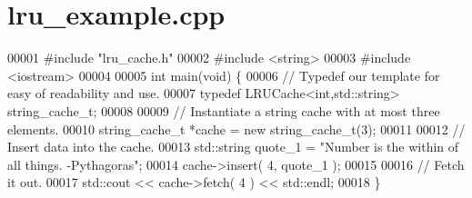\section{lru\_\-example.cpp}

\begin{DoxyCode}
00001 \textcolor{preprocessor}{#include "lru_cache.h"}
00002 \textcolor{preprocessor}{#include <string>}
00003 \textcolor{preprocessor}{#include <iostream>}
00004 
00005 \textcolor{keywordtype}{int} main(\textcolor{keywordtype}{void}) \{
00006         \textcolor{comment}{// Typedef our template for easy of readability and use.}
00007         \textcolor{keyword}{typedef} LRUCache<int,std::string> string\_cache\_t;
00008         
00009         \textcolor{comment}{// Instantiate a string cache with at most three elements.}
00010         string\_cache\_t *cache = \textcolor{keyword}{new} string\_cache\_t(3);
00011         
00012         \textcolor{comment}{// Insert data into the cache.}
00013         std::string quote\_1 = \textcolor{stringliteral}{"Number is the within of all things. -Pythagoras"};
00014         cache->insert( 4, quote\_1 );
00015 
00016         \textcolor{comment}{// Fetch it out.}
00017         std::cout << cache->fetch( 4 ) << std::endl;    
00018 \}
\end{DoxyCode}
